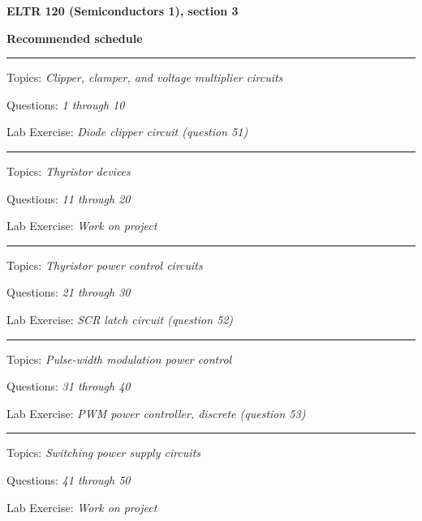 
\centerline{\bf ELTR 120 (Semiconductors 1), section 3} \bigskip 
 
\vskip 10pt

\noindent
{\bf Recommended schedule}

\vskip 5pt

\hrule \vskip 5pt
\noindent
{}

\hskip 10pt Topics: {\it Clipper, clamper, and voltage multiplier circuits}
 
\hskip 10pt Questions: {\it 1 through 10}
 
\hskip 10pt Lab Exercise: {\it Diode clipper circuit (question 51)}
 
\vskip 10pt
\hrule \vskip 5pt
\noindent
{}

\hskip 10pt Topics: {\it Thyristor devices}
 
\hskip 10pt Questions: {\it 11 through 20}
 
\hskip 10pt Lab Exercise: {\it Work on project}
 
\vskip 10pt
\hrule \vskip 5pt
\noindent
{}

\hskip 10pt Topics: {\it Thyristor power control circuits}
 
\hskip 10pt Questions: {\it 21 through 30}
 
\hskip 10pt Lab Exercise: {\it SCR latch circuit (question 52)}
 

\vskip 10pt
\hrule \vskip 5pt
\noindent
{}

\hskip 10pt Topics: {\it Pulse-width modulation power control}
 
\hskip 10pt Questions: {\it 31 through 40}
 
\hskip 10pt Lab Exercise: {\it PWM power controller, discrete (question 53)}
 
\vskip 10pt
\hrule \vskip 5pt
\noindent
{}

\hskip 10pt Topics: {\it Switching power supply circuits}
 
\hskip 10pt Questions: {\it 41 through 50}
 
\hskip 10pt Lab Exercise: {\it Work on project}
 


